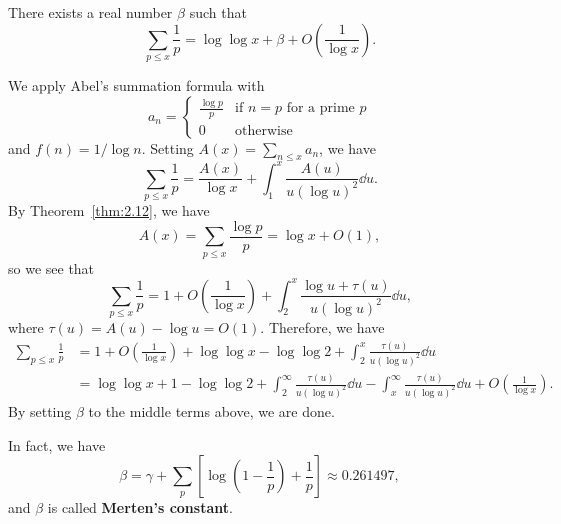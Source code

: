 \begin{thm}[Merten]\label{thm:2.13}
There exists a real number $\beta$ such that 
\[ \sum_{p \leq x} \frac1p = \log\log x + \beta + O\left(\frac1{\log x}\right). \]
\end{thm}
\begin{pf}
We apply Abel's summation formula with 
\[ a_n = \begin{cases} \frac{\log p}p & \text{if $n = p$ for a prime $p$} \\ 0 & \text{otherwise} \end{cases} \]
and $f(n) = 1/\log n$. Setting $A(x) = \sum_{n\leq x} a_n$, we have 
\[ \sum_{p \leq x} \frac1p = \frac{A(x)}{\log x} + 
\int_1^x \frac{A(u)}{u(\log u)^2}\dd u. \]
By Theorem~\ref{thm:2.12}, we have 
\[ A(x) = \sum_{p\leq x} \frac{\log p}p = \log x + O(1), \]
so we see that 
\[ \sum_{p\leq x} \frac1p = 1 + O\left(\frac1{\log x}\right)
+ \int_2^x \frac{\log u + \tau(u)}{u(\log u)^2}\dd u, \]
where $\tau(u) = A(u) - \log u = O(1)$. Therefore, we have 
\begin{align*}
    \sum_{p\leq x} \frac1p 
    &= 1 + O\left( \frac1{\log x} \right) + \log\log x 
    - \log\log 2 + \int_2^x \frac{\tau(u)}{u(\log u)^2}\dd u \\
    &= \log\log x + 1 - \log\log 2 + \int_2^\infty 
    \frac{\tau(u)}{u(\log u)^2}\dd u - 
    \int_x^\infty \frac{\tau(u)}{u(\log u)^2}\dd u + 
    O \left( \frac1{\log x} \right). 
\end{align*}
By setting $\beta$ to the middle terms above, we are done.
\end{pf}

In fact, we have 
\[ \beta = \gamma + \sum_p \left[ \log \left( 1 - \frac1p \right) + \frac1p \right] \approx 0.261497, \]
and $\beta$ is called {\bf Merten's constant}.